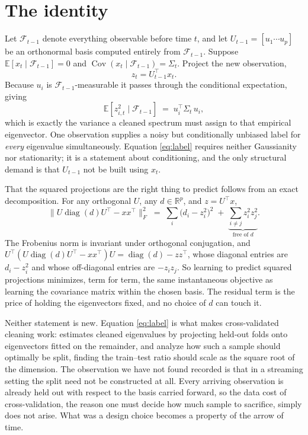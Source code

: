 \documentclass[11pt]{article}
\newcommand{\Fp}{\mathcal F_{t-1}}
\newcommand{\Ee}{\mathbb E}
\begin{document}
\section{The identity}

Let $\Fp$ denote everything observable before time $t$, and let $U_{t-1} = [u_1 \cdots u_p]$ be an
orthonormal basis computed entirely from $\Fp$. Suppose $\Ee[x_t \mid \Fp] = 0$ and
$\operatorname{Cov}(x_t \mid \Fp) = \Sigma_t$. Project the new observation,
\[
  z_t = U_{t-1}^\top x_t .
\]
Because $u_i$ is $\Fp$-measurable it passes through the conditional expectation, giving
\begin{equation}\label{eq:label}
  \Ee\!\left[z_{i,t}^2 \mid \Fp\right] \;=\; u_i^\top \Sigma_t\, u_i ,
\end{equation}
which is exactly the variance a cleaned spectrum must assign to that empirical eigenvector. One
observation supplies a noisy but conditionally unbiased label for \emph{every} eigenvalue
simultaneously. Equation \eqref{eq:label} requires neither Gaussianity nor stationarity; it is a
statement about conditioning, and the only structural demand is that $U_{t-1}$ not be built using
$x_t$.

That the squared projections are the right thing to predict follows from an exact decomposition. For
any orthogonal $U$, any $d \in \mathbb R^p$, and $z = U^\top x$,
\begin{equation}\label{eq:frob}
  \bigl\| U \operatorname{diag}(d) U^\top - x x^\top \bigr\|_F^2
   \;=\; \sum_i \bigl(d_i - z_i^2\bigr)^2 \;+\; \underbrace{\sum_{i \neq j} z_i^2 z_j^2}_{\text{free of } d} .
\end{equation}
The Frobenius norm is invariant under orthogonal conjugation, and
$U^\top ( U \operatorname{diag}(d) U^\top - xx^\top ) U = \operatorname{diag}(d) - z z^\top$, whose
diagonal entries are $d_i - z_i^2$ and whose off-diagonal entries are $-z_i z_j$. So learning to
predict squared projections minimizes, term for term, the same instantaneous objective as learning
the covariance matrix within the chosen basis. The residual term is the price of holding the
eigenvectors fixed, and no choice of $d$ can touch it.

Neither statement is new. Equation \eqref{eq:label} is what makes cross-validated cleaning work:
\citet{bartz2016} estimates cleaned eigenvalues by projecting held-out folds onto eigenvectors fitted
on the remainder, and \citet{lamrani2025holdout} analyze how such a sample should optimally be split,
finding the train--test ratio should scale as the square root of the dimension. The observation we
have not found recorded is that in a streaming setting the split need not be constructed at all.
Every arriving observation is already held out with respect to the basis carried forward, so the
data cost of cross-validation, the reason one must decide how much sample to sacrifice, simply does
not arise. What was a design choice becomes a property of the arrow of time.
\end{document}
